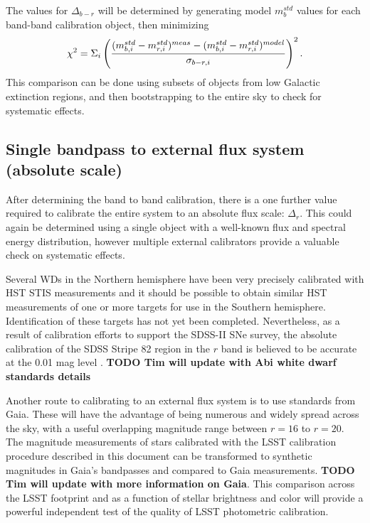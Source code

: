 \documentclass[12pt,preprint]{aastex}
\begin{document}
The values for $\Delta_{b-r}$ will be determined by generating model
$m_b^{std}$ values for each band-band calibration object, then
minimizing 
\begin{equation}
\chi^2 = \Sigma_{i} \left( { (m_{b,i}^{std} - m_{r,i}^{std})^{meas} - (m_{b,i}^{std}
    - m_{r,i}^{std})^{model} \over  \sigma_{b-r,i}}\right) ^2. 
\end{equation}
This comparison can
be done using subsets of objects from low Galactic extinction regions,
and then bootstrapping to the entire sky to check for systematic
effects. 

\subsection{Single bandpass to external flux system (absolute scale)}
\label{subsec:fluxstars}

After determining the band to band calibration, there is a one further
value required to calibrate the entire system to an absolute flux
scale: $\Delta_r$.  This could again be determined using a single
object with a well-known flux and spectral energy distribution,
however multiple external calibrators provide a valuable check on
systematic effects. 

Several WDs in the Northern hemisphere have been very precisely
calibrated with HST STIS measurements \citep{2004AJ....128.3053B} and
it should be possible to obtain similar HST measurements of one or
more targets for use in the Southern hemisphere. Identification of
these targets has not yet been completed. Nevertheless, as a result of
calibration efforts to support the SDSS-II SNe survey, the absolute
calibration of the SDSS Stripe 82 region in the $r$ band is believed
to be accurate at the 0.01 mag level \citep{Frieman2008}. 
{\bf TODO Tim will update with Abi white dwarf standards details}

Another route to calibrating to an external flux system is to use
standards from Gaia. These will have the advantage of being numerous
and widely spread across the sky, with a useful overlapping magnitude range between
$r=16$ to $r=20$.  The magnitude measurements of stars calibrated with
the LSST calibration procedure described in this document can be
transformed to synthetic magnitudes in Gaia's bandpasses and compared
to Gaia measurements. 
{\bf TODO Tim will update with more information on Gaia}.
 This comparison across the LSST footprint and as
a function of stellar brightness and color will provide a powerful
independent test of the quality of LSST photometric calibration. 
\end{document}
